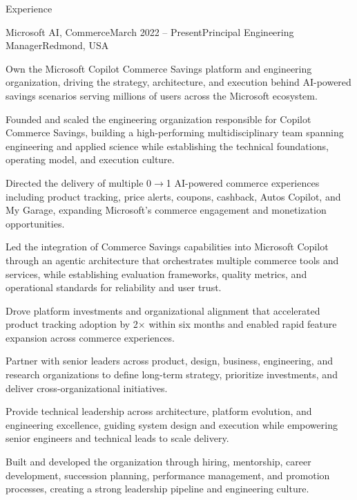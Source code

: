 \documentclass{resume}
\begin{document}
\begin{rSection}{Experience}

\begin{rSubsection}{Microsoft AI, Commerce}{March 2022 -- Present}{Principal Engineering Manager}{Redmond, USA}

\item Own the Microsoft Copilot Commerce Savings platform and engineering organization, driving the strategy, architecture, and execution behind AI-powered savings scenarios serving millions of users across the Microsoft ecosystem.

\item Founded and scaled the engineering organization responsible for Copilot Commerce Savings, building a high-performing multidisciplinary team spanning engineering and applied science while establishing the technical foundations, operating model, and execution culture.

\item Directed the delivery of multiple 0$\rightarrow$1 AI-powered commerce experiences including product tracking, price alerts, coupons, cashback, Autos Copilot, and My Garage, expanding Microsoft's commerce engagement and monetization opportunities.

\item Led the integration of Commerce Savings capabilities into Microsoft Copilot through an agentic architecture that orchestrates multiple commerce tools and services, while establishing evaluation frameworks, quality metrics, and operational standards for reliability and user trust.

\item Drove platform investments and organizational alignment that accelerated product tracking adoption by 2$\times$ within six months and enabled rapid feature expansion across commerce experiences.

\item Partner with senior leaders across product, design, business, engineering, and research organizations to define long-term strategy, prioritize investments, and deliver cross-organizational initiatives.

\item Provide technical leadership across architecture, platform evolution, and engineering excellence, guiding system design and execution while empowering senior engineers and technical leads to scale delivery.

\item Built and developed the organization through hiring, mentorship, career development, succession planning, performance management, and promotion processes, creating a strong leadership pipeline and engineering culture.


\end{rSubsection}
\end{rSection}
\end{document}
